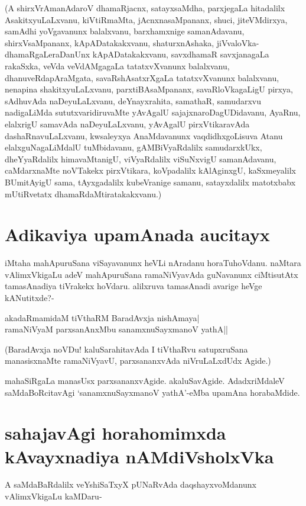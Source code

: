 (A shirxVrAmanAdaroV dhamaRjacnx, satayxsaMdha, parxjegaLa hitadalilx AsakitxyuLaLxvanu, kiVtiRmaMta, jAcnxnasaMpananx, shuci, jiteVMdirxya, samAdhi yoVgavanunx balalxvanu, barxhamxnige samanAdavanu, shirxVsaMpananx, kApADatakakxvanu, shaturxnAshaka, jiVvaloVka-dhamaRgaLeraDanUnx kApADatakakxvanu, savxdhamaR savxjanagaLa rakaSxka, veVda veVdAMgagaLa tatatxvXvanunx balalxvanu, dhanuveRdapAraMgata, savaRshAsatxrXgaLa tatatxvXvanunx balalxvanu, nenapina shakitxyuLaLxvanu, parxtiBAsaMpananx, savaRloVkagaLigU pirxya, sAdhuvAda naDeyuLaLxvanu, deYnayxrahita, samathaR, samudarxvu nadigaLiMda sututxvaridiruvaMte yAvAgalU sajajxnaroDagUDidavanu, AyaRnu, elalxrigU samavAda naDeyuLaLxvanu, yAvAgalU pirxVtikaravAda dashaRnavuLaLxvanu, kwsaleyxya AnaMdavanunx vaqdidhxgoLisuva Atanu elalxguNagaLiMdalU tuMbidavanu, gAMBiVyaRdalilx samudarxkUkx, dheYyaRdalilx himavaMtanigU, viVyaRdalilx viSuNxvigU samanAdavanu, caMdarxnaMte noVTakekx pirxVtikara, koVpadalilx kAlAginxgU, kaSxmeyalilx BUmitAyigU sama, tAyxgadalilx kubeVranige samanu, satayxdalilx matotxbabx mUtiRvetatx dhamaRdaMtiratakakxvanu.) 

\section*{Adikaviya upamAnada aucitayx} 

iMtaha mahApuruSana viSayavanunx heVLi nAradanu horaTuhoVdanu. naMtara vAlimxVkigaLu adeV mahApuruSana ramaNiVyavAda guNavanunx ciMtisutAtx tamasAnadiya tiVrakekx hoVdaru. alilxruva tamasAnadi avarige heVge kANutitxde?- 

\begin{shloka} 
akadaRmamidaM tiVthaRM BaradAvxja nishAmaya|\label{156}\\ 
ramaNiVyaM parxsanAnxMbu sanamxnuSayxmanoV yathA||
\end{shloka} 

(BaradAvxja noVDu! kaluSarahitavAda I tiVthaRvu satupxruSana manasisxnaMte ramaNiVyavU, parxsananxvAda niVruLaLxdUdx Agide.) 

mahaSiRgaLa manasUsx parxsananxvAgide. akaluSavAgide. AdadxriMdaleV saMdaBoRcitavAgi `sanamxnuSayxmanoV yathA'-eMba upamAna horabaMdide. 

\section*{sahajavAgi horahomimxda kAvayxnadiya nAMdiVsholxVka} 

A saMdaBaRdalilx veYshiSaTxyX pUNaRvAda daqshayxvoMdanunx vAlimxVkigaLu kaMDaru- 

